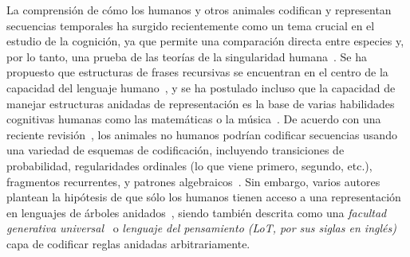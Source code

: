 
La comprensión de cómo los humanos y otros animales codifican y representan secuencias temporales ha surgido recientemente como un tema crucial en el estudio de la cognición, ya que permite una comparación directa entre especies y, por lo tanto, una prueba de las teorías de la singularidad humana~\cite{f4,f5}. Se ha propuesto que estructuras de frases recursivas se encuentran en el centro de la capacidad del lenguaje humano~\cite{f6}, y se ha postulado incluso que la capacidad de manejar estructuras anidadas de representación es la base de varias habilidades cognitivas humanas como las matemáticas o la música~\cite{f4,f7,f8,f9}. De acuerdo con una reciente revisión~\cite{f4}, los animales no humanos podrían codificar secuencias usando una variedad de esquemas de codificación, incluyendo transiciones de probabilidad, regularidades ordinales (lo que viene primero, segundo, etc.), fragmentos recurrentes, y patrones algebraicos~\cite{f10,f11,f12,f13,f14}. Sin embargo, varios autores plantean la hipótesis de que sólo los humanos tienen acceso a una representación en lenguajes de árboles anidados~\cite{f4,f8}, siendo también descrita como una \textit{facultad generativa universal}~\cite{f9} o \textit{lenguaje del pensamiento (LoT, por sus siglas en inglés)}~\cite{fodor1975language} capa de codificar reglas anidadas arbitrariamente. 

